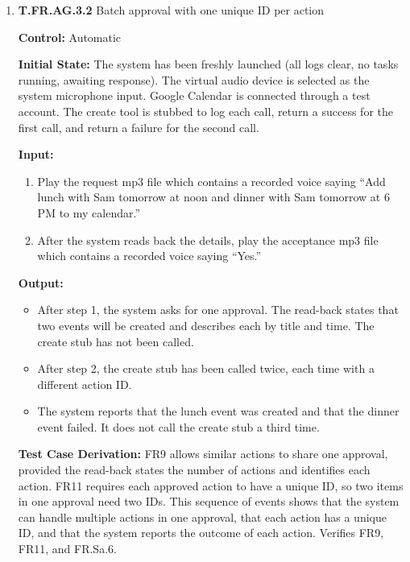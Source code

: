 \documentclass[12pt, titlepage]{article}
\begin{document}
\begin{enumerate}
\textbf{How test will be performed:} A script plays the audio files into the virtual device, triggering each step from the session event log. 
It reads the task manager state log, the tool call log, and the text of system speech, and asserts each output condition.


\item{\textbf{T.FR.AG.3.2} Batch approval with one unique ID per action\\}\label{test:T.FR.AG.3.2}

\textbf{Control:} Automatic

\textbf{Initial State:} The system has been freshly launched (all logs clear, no tasks running, awaiting response). The virtual audio device is 
selected as the system microphone input. Google Calendar is connected through a test account. The create tool is stubbed to log each call, 
return a success for the first call, and return a failure for the second call.

\textbf{Input:}
\begin{enumerate}
  \item Play the request mp3 file which contains a recorded voice saying ``Add lunch with Sam tomorrow at noon and dinner with Sam tomorrow at 6 PM to my calendar.''
  \item After the system reads back the details, play the acceptance mp3 file which contains a recorded voice saying ``Yes.''
\end{enumerate}

\textbf{Output:}
\begin{itemize}
  \item After step 1, the system asks for one approval. The read-back states that two events will be created and describes each by title and time. The create stub has not been called.
  \item After step 2, the create stub has been called twice, each time with a different action ID.
  \item The system reports that the lunch event was created and that the dinner event failed. It does not call the create stub a third time.
\end{itemize}

\textbf{Test Case Derivation:} FR9 allows similar actions to share one approval, provided the read-back states the number of actions and identifies each 
action. FR11 requires each approved action to have a unique ID, so two items in one approval need two IDs. This sequence of events shows that the system
can handle multiple actions in one approval, that each action has a unique ID, and that the system reports the outcome of each action. Verifies FR9, FR11, and FR.Sa.6.


\end{enumerate}
\end{document}
